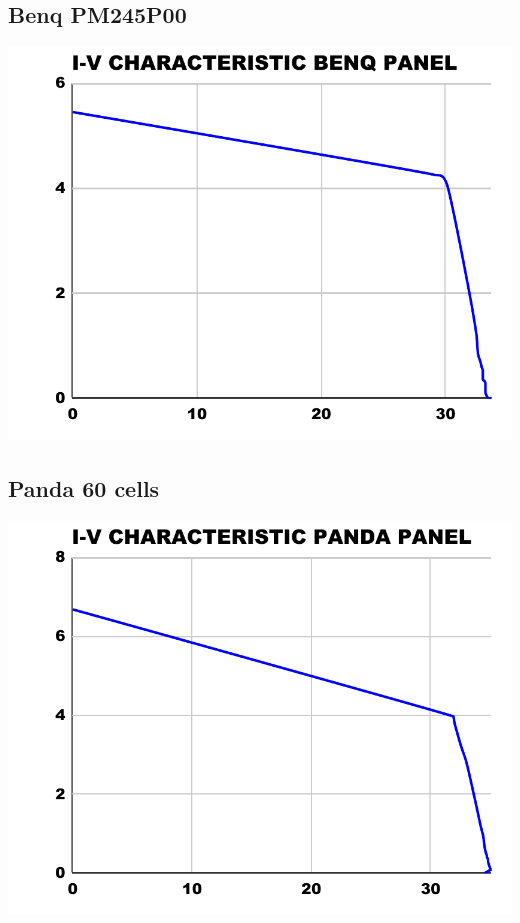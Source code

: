 \documentclass[12pt]{article}
\begin{document}
\subsection{Benq PM245P00}
	\includegraphics[scale=0.6]{benq-iv.pdf}
\subsection{Panda 60 cells}
	\includegraphics[scale=0.6]{panda-iv.pdf}
\end{document}
